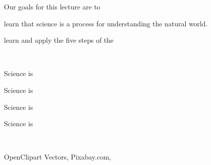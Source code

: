 \documentclass[t,handout]{beamer}  %
\begin{document}

\begin{frame}[t]{Our goals for this lecture are to}

	\hangpara learn that science is a process for understanding the natural world.
	
	\hangpara learn and apply the five steps of the 
		
\end{frame}


{
\begin{frame}[b]

	\hfill \tiny\textcolor{white}{J.J, }
\end{frame}
}


{
\begin{frame}[b]{Science is }
\end{frame}
}


{
\begin{frame}[b]{Science is }
\end{frame}
}

{
\begin{frame}[b]{Science is }
\end{frame}
}

{
\begin{frame}[b]{Science is }
\end{frame}
}

{
\begin{frame}[b]

\hfill \tiny \textcolor{white}{decltype, }
\end{frame}
}

{
\begin{frame}[b,plain]

\hfill\tiny OpenClipart Vectors, Pixabay.com, 
\end{frame}
}
\end{document}
